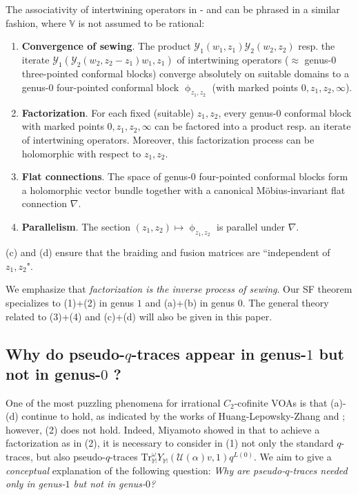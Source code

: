 \documentclass[11pt,b5paper,notitlepage]{article}
\theoremstyle{definition}
\theoremstyle{plain}
\newcommand{\mc}{\mathcal}
\newcommand{\Tr}{\mathrm{Tr}}
\newcommand{\Vbb}{\mathbb V}
\newcommand{\Mbb}{\mathbb M}
\newcommand{\<}{\left\langle}
\renewcommand{\>}{\right\rangle}
\numberwithin{equation}{section}
\begin{document}
The associativity of intertwining operators in \cite{HLZ1,HLZ2}-\cite{HLZ8} and \cite{Hua-projectivecover} can be phrased in a similar fashion, where $\Vbb$ is not assumed to be rational:

\begin{enumerate}[label=(\alph*)]
\item \textbf{Convergence of sewing}. The product $\mc Y_1(w_1,z_1)\mc Y_2(w_2,z_2)$ resp. the iterate $\mc Y_1(\mc Y_2(w_2,z_2-z_1)w_1,z_1)$ of intertwining operators ($\approx$ genus-$0$ three-pointed conformal blocks) converge absolutely on suitable domains to a genus-$0$ four-pointed conformal block $\upphi_{z_1,z_2}$ (with marked points $0,z_1,z_2,\infty$).
\item \textbf{Factorization}. For each fixed (suitable) $z_1,z_2$, every genus-$0$ conformal block with marked points $0,z_1,z_2,\infty$ can be factored into a product resp. an iterate of intertwining operators. Moreover, this factorization process can be holomorphic with respect to $z_1,z_2$.
\item \textbf{Flat connections}. The space of  genus-$0$ four-pointed conformal blocks form a holomorphic vector bundle together with a canonical M\"obius-invariant flat connection $\nabla$. 
\item \textbf{Parallelism}. The section $(z_1,z_2)\mapsto \upphi_{z_1,z_2}$ is parallel under $\nabla$.
\end{enumerate}
(c) and (d) ensure that the braiding and fusion matrices are ``independent of $z_1,z_2$". 

We emphasize that \textit{factorization is the inverse process of sewing}. Our SF theorem specializes to (1)+(2) in genus $1$ and (a)+(b) in genus $0$. The general theory related to (3)+(4) and (c)+(d) will also be given in this paper. 




\subsection{Why do pseudo-$q$-traces appear in genus-$1$ but not in genus-$0$ ?}\label{lbb60}



One of the most puzzling phenomena for irrational $C_2$-cofinite VOAs is that (a)-(d) continue to hold, as indicated by the works of Huang-Lepowsky-Zhang and \cite{Hua-projectivecover}; however, (2) does not hold. Indeed, Miyamoto showed in \cite{Miy-modular-invariance} that to achieve a factorization as in (2), it is necessary to consider in (1) not only the standard $q$-traces, but also pseudo-$q$-traces $\Tr_\Mbb^\omega Y_\Mbb(\mc U(\alpha)v,1)q^{L(0)}$. We aim to give a \textit{conceptual} explanation of the following question: \textit{Why are pseudo-$q$-traces needed only in genus-$1$ but not in genus-$0$?}
\end{document}
